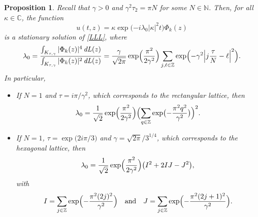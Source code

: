 \documentclass[JEP,XML,SOM,Unicode,NoFloatCountersInSection,published]{cedram}
\DeclareMathOperator{\dL}{\mathit{dL}}
\newtheorem{prop}[theorem]{Proposition}
\theoremstyle{definition}
\let\EE\exp
\newcommand\C{\mathbb C}
\newcommand\Z{\mathbb Z}
\begin{document}

\begin{prop}\label{prop34}
Recall that $\gamma > 0$ and $\gamma^2 \tau_2 = \pi N$ for some $N \in \mathbb{N}$. Then, for all $\kappa \in \C$, the function
\[
u(t,z) = \kappa \EE\bigl({-i\lambda_0 |\kappa|^2t}\bigr)\Phi_k(z)
\]
is a stationary solution of \eqref{LLL}, where
\begin{equation}\label{def-lambda}
\lambda_0=\frac{\int_{K_{\tau, \gamma}} |\Phi_{k}(z)|^4\dL(z)}{\int_{K_{\tau, \gamma}} |\Phi_{k}(z)|^2\dL(z)}= \frac{\gamma}{\sqrt{2\pi}} \EE\Bigl(\frac{\pi^2}{2\gamma^2}\Bigr)\sum_{j, \ell\in \Z}\EE\Bigl({-\gamma^2 \Bigl|j\frac{\tau}N-\ell \Bigr|^{2}}\Bigr).
\end{equation}
In particular,
\begin{itemize}
\item If $N=1$ and $\tau={i \pi }/{\gamma^2}$, which corresponds to the rectangular lattice, then
\begin{equation}\label{lambda-carre}
\lambda_0= \frac{1}{\sqrt{2}} \EE\Bigl(\frac{\pi^2}{2\gamma^2}\Bigr)\Bigl(\sum_{q\in\Z}\EE\bigl({-\frac{\pi^2q^2}{\gamma^2}}\bigr)\Bigr)^2.
\end{equation}
\item If $N=1$, $\tau=\EE\bigl({{2 i\pi}/3}\bigr)$ and $\gamma={\sqrt{2\pi}}/ {3^{1/4}}$, which corresponds to the hexagonal lattice, then
\begin{equation}\label{lambda-hexa}
\lambda_0=\frac{1}{\sqrt{2}} \EE\Bigl(\frac{\pi^2}{2\gamma^2}\Bigr)\bigl(I^2+2IJ-J^2\bigr),
\end{equation}
with
\[
I = \sum_{j \in \Z}\EE\Bigl(- \frac{\pi^2(2j)^2}{\gamma^2} \Bigr) \quad\text{and} \quad J=\sum_{j \in \Z}\EE\Bigl(- \frac{\pi^2(2j+1)^2}{\gamma^2} \Bigr).
\]
\end{itemize}
\end{prop}
\end{document}
